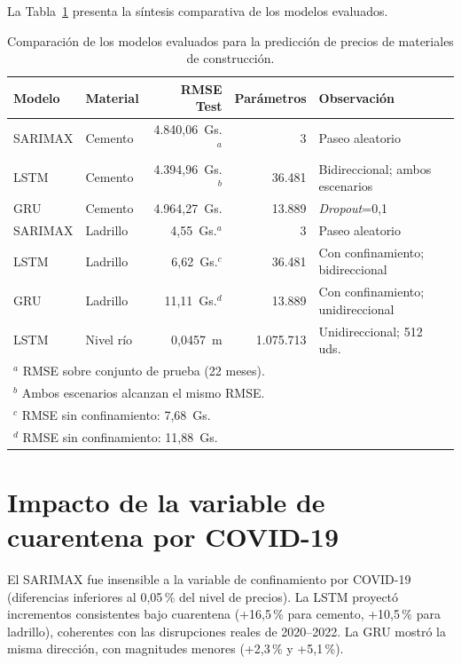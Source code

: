 \justify
La Tabla~\ref{tab:comparacion_modelos} presenta la síntesis comparativa de los modelos evaluados.

\begin{table}[ht]
    \centering
    \caption{Comparación de los modelos evaluados para la predicción de precios de materiales de construcción.}
    \label{tab:comparacion_modelos}
    \begin{tabular}{llrrl}
        \toprule
        \textbf{Modelo} & \textbf{Material} & \textbf{RMSE Test} & \textbf{Parámetros} & \textbf{Observación} \\
        \midrule
        SARIMAX & Cemento  & 4.840{,}06~Gs.$^{a}$  & 3      & Paseo aleatorio \\
        LSTM    & Cemento  & 4.394{,}96~Gs.$^{b}$  & 36.481 & Bidireccional; ambos escenarios \\
        GRU     & Cemento  & 4.964{,}27~Gs.        & 13.889 & \textit{Dropout}=0{,}1 \\
        \midrule
        SARIMAX & Ladrillo & 4{,}55~Gs.$^{a}$      & 3      & Paseo aleatorio \\
        LSTM    & Ladrillo & 6{,}62~Gs.$^{c}$      & 36.481 & Con confinamiento; bidireccional \\
        GRU     & Ladrillo & 11{,}11~Gs.$^{d}$     & 13.889 & Con confinamiento; unidireccional \\
        \midrule
        LSTM    & Nivel río & 0{,}0457~m        & 1.075.713 & Unidireccional; 512 uds. \\
        \bottomrule
        \multicolumn{5}{l}{\footnotesize $^{a}$ RMSE sobre conjunto de prueba (22 meses).} \\
        \multicolumn{5}{l}{\footnotesize $^{b}$ Ambos escenarios alcanzan el mismo RMSE.} \\
        \multicolumn{5}{l}{\footnotesize $^{c}$ RMSE sin confinamiento: 7{,}68~Gs.} \\
        \multicolumn{5}{l}{\footnotesize $^{d}$ RMSE sin confinamiento: 11{,}88~Gs.}
    \end{tabular}
\end{table}
\section{Impacto de la variable de cuarentena por COVID-19}

\justify
El SARIMAX fue insensible a la variable de confinamiento por COVID-19 (diferencias inferiores al 0{,}05\,\% del nivel de precios). La LSTM proyectó incrementos consistentes bajo cuarentena (+16{,}5\,\% para cemento, +10{,}5\,\% para ladrillo), coherentes con las disrupciones reales de 2020--2022. La GRU mostró la misma dirección, con magnitudes menores (+2{,}3\,\% y +5{,}1\,\%).

